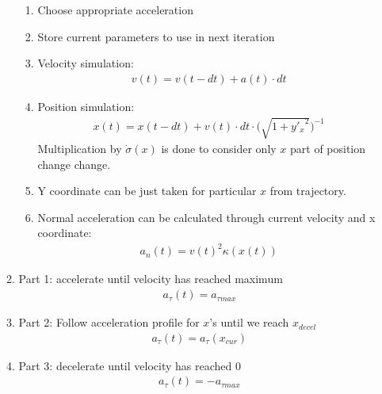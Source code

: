 \documentclass{article}
\begin{document}
\begin{enumerate}
\begin{enumerate}
                        \begin{enumerate}
                              \item Choose appropriate acceleration
                              \item Store current parameters to use in next iteration
                              \item Velocity simulation:
                                    \begin{align}
                                          v(t) = v(t - dt) + a(t) \cdot dt
                                    \end{align}
                              \item Position simulation:
                                    \begin{align}
                                          x(t) = x(t - dt) + v(t) \cdot dt \cdot \Big( \sqrt{1 + {y'_{x}}^2}\Big)^{-1}
                                    \end{align}
                                    Multiplication by $\dot{\sigma} (x)$ is done to consider only $x$ part of position change change.
                              \item Y coordinate can be just taken for particular $x$ from trajectory.
                              \item Normal acceleration can be calculated through current velocity and x coordinate:
                                    \begin{align}
                                          a_n(t) = v(t)^2 \kappa(x(t))
                                    \end{align}
                        \end{enumerate}
                  \item Part 1: accelerate until velocity has reached maximum
                        \begin{align}
                              a_{\tau}(t) = a_{\tau max}
                        \end{align}
                  \item Part 2: Follow acceleration profile for $x$'s until we reach $x_{decel}$
                        \begin{align}
                              a_{\tau}(t) = a_{\tau}(x_{cur})
                        \end{align}
                  \item Part 3: decelerate until velocity has reached 0
                        \begin{align}
                              a_{\tau}(t) = -a_{\tau max}
                        \end{align}
            \end{enumerate}
\end{enumerate}
\end{document}
